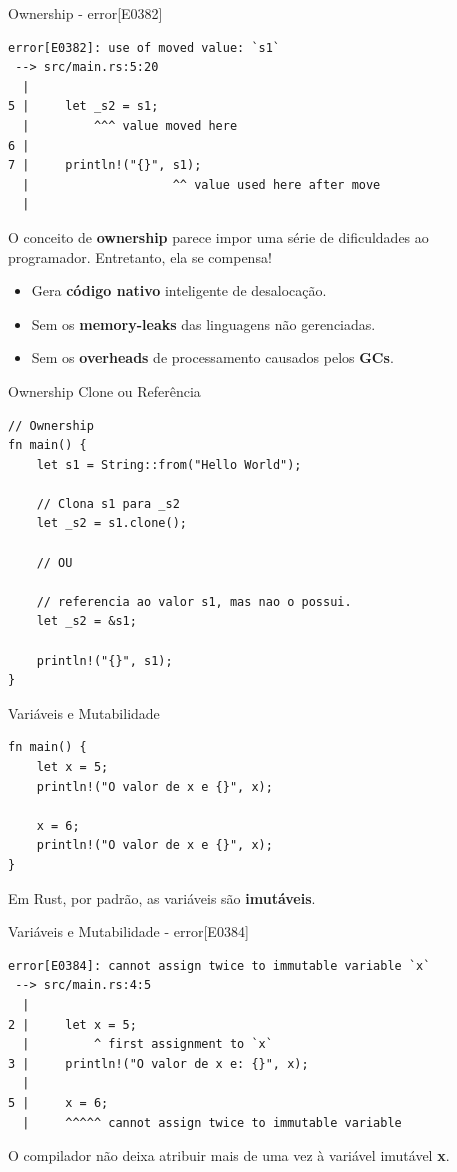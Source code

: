 \begin{frame}[fragile]{Ownership - error[E0382]}

\lstset{language=Rust, style=boxed}
\begin{lstlisting}
error[E0382]: use of moved value: `s1`
 --> src/main.rs:5:20
  |
5 |     let _s2 = s1;
  |         ^^^ value moved here
6 |
7 |     println!("{}", s1);
  |                    ^^ value used here after move
  |
\end{lstlisting}
\small{O conceito de \textbf{ownership} parece impor uma série de dificuldades ao 
programador. Entretanto, ela se compensa!}
\begin{itemize}  
\item Gera  \textbf{código nativo} inteligente de desalocação.
\item Sem os \textbf{memory-leaks} das linguagens não gerenciadas. 
\item Sem os \textbf{overheads} de processamento causados pelos  \textbf{GCs}. 
\end{itemize}
\end{frame}
    
\begin{frame}[fragile]{Ownership Clone ou Referência}
\lstset{language=Rust, style=boxed}
\begin{lstlisting}
// Ownership
fn main() {
    let s1 = String::from("Hello World");

    // Clona s1 para _s2
    let _s2 = s1.clone();
    
    // OU
    
    // referencia ao valor s1, mas nao o possui.
    let _s2 = &s1; 

    println!("{}", s1);
}
\end{lstlisting}
\end{frame}

\begin{frame}[fragile]{Variáveis e Mutabilidade}
\lstset{language=Rust, style=boxed}
\begin{lstlisting}
fn main() {
    let x = 5;
    println!("O valor de x e {}", x);
    
    x = 6;
    println!("O valor de x e {}", x);
}
\end{lstlisting}
\small{Em Rust, por padrão, as variáveis são \textbf{imutáveis}. }
\end{frame}

\begin{frame}[fragile]{Variáveis e Mutabilidade - error[E0384]}
\lstset{language=Rust, style=boxed}
\begin{lstlisting}
error[E0384]: cannot assign twice to immutable variable `x`
 --> src/main.rs:4:5
  |
2 |     let x = 5;
  |         ^ first assignment to `x`
3 |     println!("O valor de x e: {}", x);
  |
5 |     x = 6;
  |     ^^^^^ cannot assign twice to immutable variable
\end{lstlisting}
\small{O compilador não deixa atribuir mais de uma vez à variável imutável \textbf{x}.}
\end{frame}

